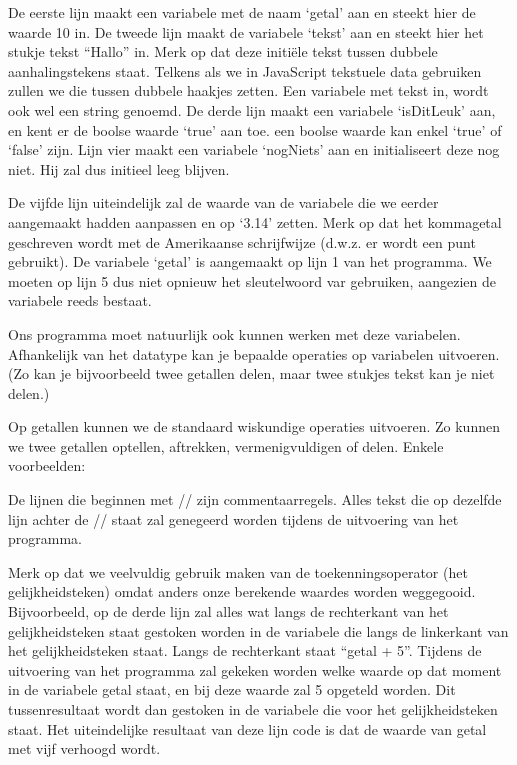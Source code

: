 De eerste lijn maakt een variabele met de naam `getal' aan en steekt hier de waarde 10 in. De tweede lijn maakt de variabele `tekst' aan en steekt hier het stukje tekst ``Hallo'' in. Merk op dat deze initi\"ele tekst tussen dubbele aanhalingstekens staat. Telkens als we in JavaScript tekstuele data gebruiken zullen we die tussen dubbele haakjes zetten. Een variabele met tekst in, wordt ook wel een string genoemd. De derde lijn maakt een variabele `isDitLeuk' aan, en kent er de boolse waarde `true' aan toe. een boolse waarde kan enkel `true' of `false' zijn. Lijn vier maakt een variabele `nogNiets' aan en initialiseert deze nog niet. Hij zal dus initieel leeg blijven.

De vijfde lijn uiteindelijk zal de waarde van de variabele die we eerder aangemaakt hadden aanpassen en op `3.14' zetten. Merk op dat het kommagetal geschreven wordt met de Amerikaanse schrijfwijze (d.w.z. er wordt een punt gebruikt). De variabele `getal' is aangemaakt op lijn 1 van het programma. We moeten op lijn 5 dus niet opnieuw het sleutelwoord var gebruiken, aangezien  de variabele reeds bestaat.

Ons programma moet natuurlijk ook kunnen werken met deze variabelen. Afhankelijk van het datatype kan je bepaalde operaties op variabelen uitvoeren. (Zo kan je bijvoorbeeld twee getallen delen, maar twee stukjes tekst kan je niet delen.)

Op getallen kunnen we de standaard wiskundige operaties uitvoeren. Zo kunnen we twee getallen optellen, aftrekken, vermenigvuldigen of delen. Enkele voorbeelden:


De lijnen die beginnen met // zijn commentaarregels. Alles tekst die op dezelfde lijn achter de // staat zal genegeerd worden tijdens de uitvoering van het programma.

Merk op dat we veelvuldig gebruik maken van de toekenningsoperator (het gelijkheidsteken) omdat anders onze berekende waardes worden weggegooid. Bijvoorbeeld, op de derde lijn zal alles wat langs de rechterkant van het gelijkheidsteken staat gestoken worden in de variabele die langs de linkerkant van het gelijkheidsteken staat. Langs de rechterkant staat ``getal + 5''. Tijdens de uitvoering van het programma zal gekeken worden welke waarde op dat moment in de variabele getal staat, en bij deze waarde zal 5 opgeteld worden. Dit tussenresultaat wordt dan gestoken in de variabele die voor het gelijkheidsteken staat. Het uiteindelijke resultaat van deze lijn code is dat de waarde van getal met vijf verhoogd wordt.

